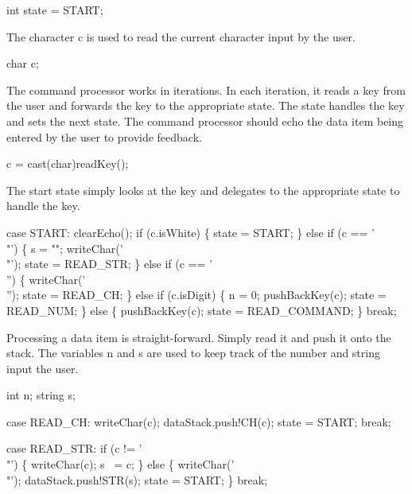 int state = START;

\nwendcode{}The character {\Tt{}c\nwendquote} is used to read the current character input by
the user.

\nwenddocs{}\endmoddef\nwstartdeflinemarkup\nwenddeflinemarkup
char c;

\nwendcode{}The command processor works in iterations. In each iteration, it
reads a key from the user and forwards the key to the appropriate
state. The state handles the key and sets the next state. The command
processor should echo the data item being entered by the user to
provide feedback.

\nwenddocs{}\endmoddef\nwstartdeflinemarkup\nwenddeflinemarkup
c   = cast(char)readKey();

\nwendcode{}The start state simply looks at the key and delegates to the
appropriate state to handle the key.

\nwenddocs{}\endmoddef\nwstartdeflinemarkup\nwenddeflinemarkup
case START:
  clearEcho();
  if (c.isWhite) \{
    state = START;
  \} else if (c == '\\"') \{
    s = "";
    writeChar('\\"');
    state = READ_STR;
  \} else if (c == '\\'') \{
    writeChar('\\'');
    state = READ_CH;
  \} else if (c.isDigit) \{
    n = 0;
    pushBackKey(c);
    state = READ_NUM;
  \} else \{
    pushBackKey(c);
    state = READ_COMMAND;
  \}
  break;

\nwendcode{}Processing a data item is straight-forward. Simply read it and push
it onto the stack. The variables {\Tt{}n\nwendquote} and {\Tt{}s\nwendquote} are used to keep
track of the number and string input the user.

\nwenddocs{}\plusendmoddef\nwstartdeflinemarkup\nwenddeflinemarkup
int n;
string s;

\nwendcode{}\endmoddef\nwstartdeflinemarkup\nwenddeflinemarkup
case READ_CH:
  writeChar(c);
  dataStack.push!CH(c);
  state = START;
  break;

case READ_STR:
  if (c != '\\"') \{
    writeChar(c);
    s ~= c;
  \} else \{
    writeChar('\\"');
    dataStack.push!STR(s);
    state = START;
  \}
  break;


